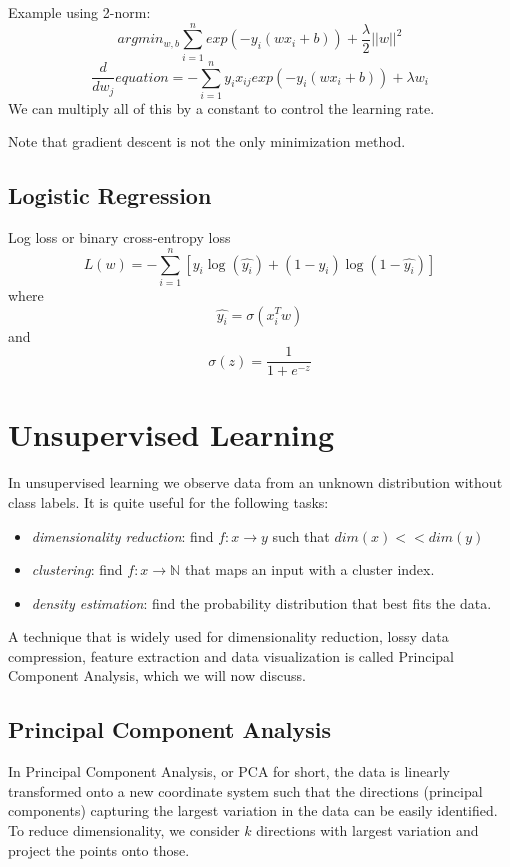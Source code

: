 \documentclass[11pt]{article}
\begin{document}
Example using 2-norm:
\[argmin_{w, b}\sum_{i=1}^n exp(-y_i(wx_i+b))+\frac{\lambda}{2}||w||^2\]
\[\frac{d}{dw_j}equation = -\sum_{i=1}^n y_ix_{ij}exp(-y_i(wx_i+b))+\lambda w_i\]
We can multiply all of this by a constant to control the learning rate.

Note that gradient descent is not the only minimization method.

\subsection{Logistic Regression}\label{logistic-regression}

Log loss or binary cross-entropy loss
\[L(w) = -\sum_{i=1}^n [y_i\log(\hat{y_i})+(1-y_i)\log(1-\hat{y_i})]\]
where \[\hat{y_i} = \sigma (x_i^Tw)\] and
\[\sigma (z)=\frac{1}{1+e^{-z}}\]

\section{Unsupervised Learning}\label{unsupervised-learning-1}

In unsupervised learning we observe data from an unknown distribution
without class labels. It is quite useful for the following tasks:

\begin{itemize}
\tightlist
\item
  \emph{dimensionality reduction}: find \(f: x\rightarrow y\) such that
  \(dim(x)<<dim(y)\)
\item
  \emph{clustering}: find \(f: x\rightarrow \mathbb{N}\) that maps an
  input with a cluster index.
\item
  \emph{density estimation}: find the probability distribution that best
  fits the data.
\end{itemize}

A technique that is widely used for dimensionality reduction, lossy data
compression, feature extraction and data visualization is called
Principal Component Analysis, which we will now discuss.

\subsection{Principal Component
Analysis}\label{principal-component-analysis}

In Principal Component Analysis, or PCA for short, the data is linearly
transformed onto a new coordinate system such that the directions
(principal components) capturing the largest variation in the data can
be easily identified. To reduce dimensionality, we consider \(k\)
directions with largest variation and project the points onto those.
\end{document}
